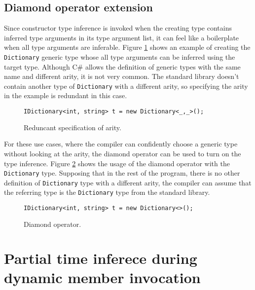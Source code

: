 \subsection{Diamond operator extension} \label{sect13:ex2}

Since constructor type inference is invoked when the creating type contains inferred type arguments in its type argument list, it can feel like a boilerplate when all type arguments are inferable. 
Figure \ref{img57:diamondExample} shows an example of creating the \texttt{Dictionary} generic type whose all type arguments can be inferred using the target type. 
Although C\# allows the definition of generic types with the same name and different arity, it is not very common. 
The standard library doesn’t contain another type of \texttt{Dictionary} with a different arity, so specifying the arity in the example is redundant in this case.
\begin{figure}[h!]
\begin{lstlisting}[style=csharp, mathescape=true]
IDictionary<int, string> t = new Dictionary<_,_>();
\end{lstlisting}
\caption{Reduncant specification of arity.}
\label{img57:diamondExample}
\end{figure}
\par
For these use cases, where the compiler can confidently choose a generic type without looking at the arity, the diamond operator can be used to turn on the type inference. 
Figure \ref{img58:diamondExample2} shows the usage of the diamond operator with the \texttt{Dictionary} type. 
Supposing that in the rest of the program, there is no other definition of \texttt{Dictionary} type with a different arity, the compiler can assume that the referring type is the \texttt{Dictionary} type from the standard library.
\begin{figure}[h!]
\begin{lstlisting}[style=csharp, mathescape=true]
IDictionary<int, string> t = new Dictionary<>();
\end{lstlisting}
\caption{Diamond operator.}
\label{img58:diamondExample2}
\end{figure}

\section{Partial time inferece during dynamic member invocation} \label{sect11:dynamic}

